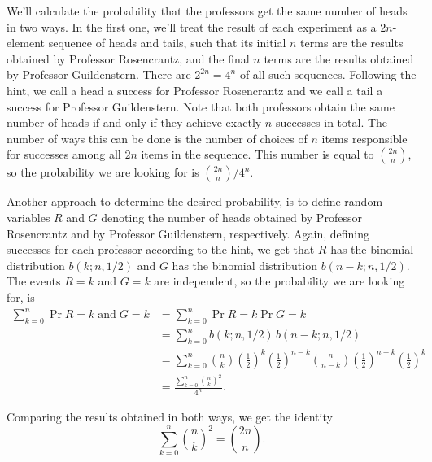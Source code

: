 \starred
We'll calculate the probability that the professors get the same number of heads in two ways.
In the first one, we'll treat the result of each experiment as a $2n$-element sequence of heads and tails, such that its initial $n$ terms are the results obtained by Professor Rosencrantz, and the final $n$ terms are the results obtained by Professor Guildenstern.
There are $2^{2n}=4^n$ of all such sequences.
Following the hint, we call a head a success for Professor Rosencrantz and we call a tail a success for Professor Guildenstern.
Note that both professors obtain the same number of heads if and only if they achieve exactly $n$ successes in total.
The number of ways this can be done is the number of choices of $n$ items responsible for successes among all $2n$ items in the sequence.
This number is equal to $\binom{2n}{n}$, so the probability we are looking for is $\binom{2n}{n}/4^n$.

Another approach to determine the desired probability, is to define random variables $R$ and $G$ denoting the number of heads obtained by Professor Rosencrantz and by Professor Guildenstern, respectively.
Again, defining successes for each professor according to the hint, we get that $R$ has the binomial distribution $b(k;n,1/2)$ and $G$ has the binomial distribution $b(n-k;n,1/2)$.
The events $R=k$ and $G=k$ are independent, so the probability we are looking for, is
\begin{align*}
    \sum_{k=0}^n\Pr{R=k\;\text{and}\;G=k} &= \sum_{k=0}^n\Pr{R=k}\Pr{G=k} \\
    &= \sum_{k=0}^nb(k;n,1/2)\,b(n-k;n,1/2) \\
    &= \sum_{k=0}^n\binom{n}{k}\left(\frac{1}{2}\right)^k\left(\frac{1}{2}\right)^{n-k}\binom{n}{n-k}\left(\frac{1}{2}\right)^{n-k}\left(\frac{1}{2}\right)^k \\
    &= \frac{\sum_{k=0}^n\binom{n}{k}^2}{4^n}.
\end{align*}

Comparing the results obtained in both ways, we get the identity
\[
    \sum_{k=0}^n\binom{n}{k}^2 = \binom{2n}{n}.
\]
